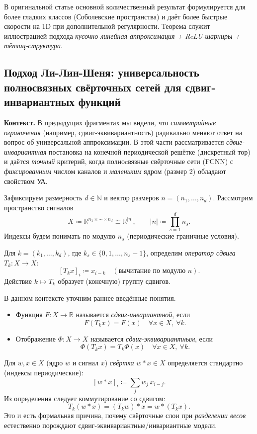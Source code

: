 \documentclass[../NDCNNAI_main.tex]{subfiles}
\begin{document}
\begin{remark}
В оригинальной статье основной количественный результат формулируется для более гладких классов (Соболевские пространства)
и даёт более быстрые скорости на 1D при дополнительной регулярности.
Теорема служит иллюстрацией подхода \emph{кусочно-линейная аппроксимация + ReLU-шарниры + тёплиц-структура}.  
\end{remark}

\subsection{Подход Ли-Лин-Шеня: универсальность полносвязных свёрточных сетей для сдвиг-инвариантных функций}

\textbf{Контекст.}
В предыдущих фрагментах мы видели, что \emph{симметрийные ограничения} (например, сдвиг-эквивариантность) радикально меняют ответ на вопрос об универсальной аппроксимации.
В этой части рассматривается \emph{сдвиг-инвариантная} постановка на конечной периодической решётке (дискретный тор) и даётся \emph{точный} критерий, когда полноcвязные свёрточные сети (FCNN) с \emph{фиксированным} числом каналов и \emph{маленьким} ядром (размер 2) обладают свойством УА.

Зафиксируем размерность $d\in\mathbb{N}$ и вектор размеров $n=(n_1,\dots,n_d)$.
Рассмотрим пространство сигналов
\[
X \coloneq  \mathbb{R}^{n_1\times\cdots\times n_d}\cong \mathbb{R}^{|n|},\qquad |n|\coloneq \prod_{s=1}^d n_s.
\]
Индексы будем понимать по модулю $n_s$ (периодические граничные условия).

Для $k=(k_1,\dots,k_d)$, где $k_s\in\{0,1,\dots,n_s-1\}$, определим \emph{оператор сдвига} $T_k\colon X\to X$:
\[
[T_k x]_i \coloneq  x_{i-k}\quad(\text{вычитание по модулю }n).
\]
Действие $k\mapsto T_k$ образует (конечную) группу сдвигов.

В данном контексте уточним раннее введённые понятия.
\begin{itemize}
  \item Функция $F\colon X\to\mathbb{R}$ называется \emph{сдвиг-инвариантной}, если
  \[
    F(T_k x)=F(x)\quad\forall x\in X,\ \forall k.
  \]
  \item Отображение $\Phi\colon X\to X$ называется \emph{сдвиг-эквивариантным}, если
  \[
    \Phi(T_k x)=T_k\Phi(x)\quad\forall x\in X,\ \forall k.
  \]
\end{itemize}

Для $w,x\in X$ (ядро $w$ и сигнал $x$) \emph{свёртка} $w*x\in X$ определяется стандартно (индексы периодические):
\[
[w*x]_i\coloneq \sum_{j} w_j\,x_{i-j}.
\]
Из определения следует коммутирование со сдвигом:
\[
T_k(w*x)=(T_k w)*x=w*(T_k x).
\]
Это и есть формальная причина, почему свёрточные слои при \emph{разделении весов} естественно порождают сдвиг-эквивариантные/инвариантные модели.
\end{document}
